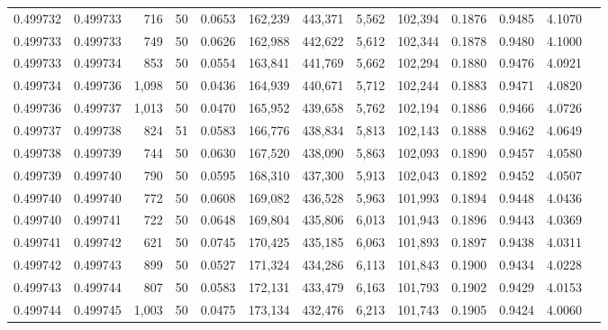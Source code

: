 \begin{tabular}{rrrrrrrrrrrrr}
0.499732 & 0.499733 &   716 &  50 &                                     0.0653 & 162,239 & 443,371 &   5,562 & 102,394 & 0.1876 & 0.9485 & 4.1070 \\
0.499733 & 0.499733 &   749 &  50 &                                     0.0626 & 162,988 & 442,622 &   5,612 & 102,344 & 0.1878 & 0.9480 & 4.1000 \\
0.499733 & 0.499734 &   853 &  50 &                                     0.0554 & 163,841 & 441,769 &   5,662 & 102,294 & 0.1880 & 0.9476 & 4.0921 \\
0.499734 & 0.499736 & 1,098 &  50 &                                     0.0436 & 164,939 & 440,671 &   5,712 & 102,244 & 0.1883 & 0.9471 & 4.0820 \\
0.499736 & 0.499737 & 1,013 &  50 &                                     0.0470 & 165,952 & 439,658 &   5,762 & 102,194 & 0.1886 & 0.9466 & 4.0726 \\
0.499737 & 0.499738 &   824 &  51 &                                     0.0583 & 166,776 & 438,834 &   5,813 & 102,143 & 0.1888 & 0.9462 & 4.0649 \\
0.499738 & 0.499739 &   744 &  50 &                                     0.0630 & 167,520 & 438,090 &   5,863 & 102,093 & 0.1890 & 0.9457 & 4.0580 \\
0.499739 & 0.499740 &   790 &  50 &                                     0.0595 & 168,310 & 437,300 &   5,913 & 102,043 & 0.1892 & 0.9452 & 4.0507 \\
0.499740 & 0.499740 &   772 &  50 &                                     0.0608 & 169,082 & 436,528 &   5,963 & 101,993 & 0.1894 & 0.9448 & 4.0436 \\
0.499740 & 0.499741 &   722 &  50 &                                     0.0648 & 169,804 & 435,806 &   6,013 & 101,943 & 0.1896 & 0.9443 & 4.0369 \\
0.499741 & 0.499742 &   621 &  50 &                                     0.0745 & 170,425 & 435,185 &   6,063 & 101,893 & 0.1897 & 0.9438 & 4.0311 \\
0.499742 & 0.499743 &   899 &  50 &                                     0.0527 & 171,324 & 434,286 &   6,113 & 101,843 & 0.1900 & 0.9434 & 4.0228 \\
0.499743 & 0.499744 &   807 &  50 &                                     0.0583 & 172,131 & 433,479 &   6,163 & 101,793 & 0.1902 & 0.9429 & 4.0153 \\
0.499744 & 0.499745 & 1,003 &  50 &                                     0.0475 & 173,134 & 432,476 &   6,213 & 101,743 & 0.1905 & 0.9424 & 4.0060 \\

\end{tabular}
